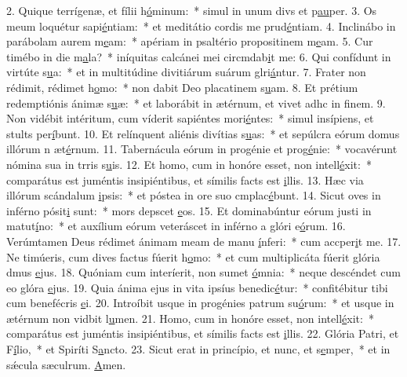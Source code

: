 2. Quique terrígenæ, et fílii h\uline{ó}minum:~* simul in unum divs et p\uline{au}per.
3. Os meum loquétur sapi\uline{é}ntiam:~* et meditátio cordis me prud\uline{é}ntiam.
4. Inclinábo in parábolam aurem m\uline{e}am:~* apériam in psaltério propositinem m\uline{e}am.
5. Cur timébo in die m\uline{a}la?~* iníquitas calcánei mei circmdab\uline{i}t me:
6. Qui confídunt in virtúte s\uline{u}a:~* et in multitúdine divitiárum suárum glri\uline{á}ntur.
7. Frater non rédimit, rédimet h\uline{o}mo:~* non dabit Deo placatinem s\uline{u}am.
8. Et prétium redemptiónis ánimæ s\uline{u}æ:~* et laborábit in ætérnum, et vivet adhc in f\uline{i}nem.
9. Non vidébit intéritum, cum víderit sapiéntes mori\uline{é}ntes:~* simul insípiens, et stults per\uline{í}bunt.
10. Et relínquent aliénis divítias s\uline{u}as:~* et sepúlcra eórum domus illórum n æt\uline{é}rnum.
11. Tabernácula eórum in progénie et prog\uline{é}nie:~* vocavérunt nómina sua in trris s\uline{u}is.
12. Et homo, cum in honóre esset, non intell\uline{é}xit:~* comparátus est juméntis insipiéntibus, et símilis facts est \uline{i}llis.
13. Hæc via illórum scándalum \uline{i}psis:~* et póstea in ore suo cmplac\uline{é}bunt.
14. Sicut oves in inférno pósit\uline{i} sunt:~* mors depscet \uline{e}os.
15. Et dominabúntur eórum justi in matut\uline{í}no:~* et auxílium eórum veteráscet in inférno a glóri e\uline{ó}rum.
16. Verúmtamen Deus rédimet ánimam meam de manu \uline{í}nferi:~* cum accper\uline{i}t me.
17. Ne timúeris, cum dives factus fúerit h\uline{o}mo:~* et cum multiplicáta fúerit glória dmus \uline{e}jus.
18. Quóniam cum interíerit, non sumet \uline{ó}mnia:~* neque descéndet cum eo glóra \uline{e}jus.
19. Quia ánima ejus in vita ipsíus benedic\uline{é}tur:~* confitébitur tibi cum benefécris \uline{e}i.
20. Introíbit usque in progénies patrum su\uline{ó}rum:~* et usque in ætérnum non vidbit l\uline{u}men.
21. Homo, cum in honóre esset, non intell\uline{é}xit:~* comparátus est juméntis insipiéntibus, et símilis facts est \uline{i}llis.
22. Glória Patri, et F\uline{í}lio,~* et Spiríti S\uline{a}ncto.
23. Sicut erat in princípio, et nunc, et s\uline{e}mper,~* et in sǽcula sæculrum. \uline{A}men.
